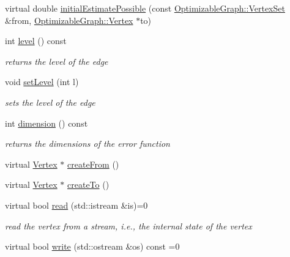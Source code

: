 \begin{DoxyCompactItemize}
\item 
virtual double \mbox{\hyperlink{classg2o_1_1_optimizable_graph_1_1_edge_a1cef6ffa0f82f1ad3dd3d7a9f04425ee}{initial\+Estimate\+Possible}} (const \mbox{\hyperlink{classg2o_1_1_hyper_graph_a703938cdb4bb636860eed55a2489d70c}{Optimizable\+Graph\+::\+Vertex\+Set}} \&from, \mbox{\hyperlink{classg2o_1_1_optimizable_graph_1_1_vertex}{Optimizable\+Graph\+::\+Vertex}} $\ast$to)
\item 
int \mbox{\hyperlink{classg2o_1_1_optimizable_graph_1_1_edge_a25c2b618815622ab79705c497390d22f}{level}} () const
\begin{DoxyCompactList}\small\item\em returns the level of the edge \end{DoxyCompactList}\item 
void \mbox{\hyperlink{classg2o_1_1_optimizable_graph_1_1_edge_ab3e4290bc51d03ba294f36254048b15a}{set\+Level}} (int l)
\begin{DoxyCompactList}\small\item\em sets the level of the edge \end{DoxyCompactList}\item 
int \mbox{\hyperlink{classg2o_1_1_optimizable_graph_1_1_edge_a0eb19697e201bd195c45ca78d55fd041}{dimension}} () const
\begin{DoxyCompactList}\small\item\em returns the dimensions of the error function \end{DoxyCompactList}\item 
virtual \mbox{\hyperlink{classg2o_1_1_optimizable_graph_1_1_vertex}{Vertex}} $\ast$ \mbox{\hyperlink{classg2o_1_1_optimizable_graph_1_1_edge_abd98d7a174df25bcc82cfdacba682fec}{create\+From}} ()
\item 
virtual \mbox{\hyperlink{classg2o_1_1_optimizable_graph_1_1_vertex}{Vertex}} $\ast$ \mbox{\hyperlink{classg2o_1_1_optimizable_graph_1_1_edge_a39c22b396ab312059ea8fa4c2776be2e}{create\+To}} ()
\item 
virtual bool \mbox{\hyperlink{classg2o_1_1_optimizable_graph_1_1_edge_a30cf69b762a06aa35e796d8af71632b0}{read}} (std\+::istream \&is)=0
\begin{DoxyCompactList}\small\item\em read the vertex from a stream, i.\+e., the internal state of the vertex \end{DoxyCompactList}\item 
virtual bool \mbox{\hyperlink{classg2o_1_1_optimizable_graph_1_1_edge_a804b9a2178249b9297c55b8fbbeda56e}{write}} (std\+::ostream \&os) const =0

\end{DoxyCompactItemize}
